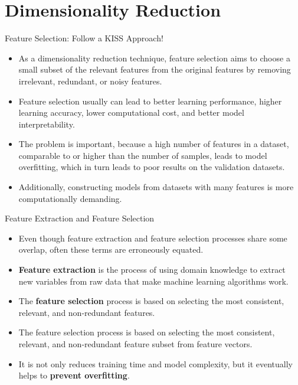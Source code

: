 \documentclass[11pt]{beamer}
\begin{document}
\section{Dimensionality Reduction}

\begin{frame}{Feature Selection: Follow a KISS Approach!}
	\begin{itemize}
		\item As a dimensionality reduction technique, feature selection aims to choose a small subset of the relevant features from the original features by removing irrelevant, redundant, or noisy features. 
		\item Feature selection usually can lead to better learning performance, higher learning accuracy, lower computational cost, and better model interpretability.
		\item The problem is important, because a high number of features in a dataset, comparable to or higher than the number of samples, leads to model overfitting, which in turn leads to poor results on the validation datasets. 
		\item Additionally, constructing models from datasets with many features is more computationally demanding.
	\end{itemize}
\end{frame}
\begin{frame}{Feature Extraction and Feature Selection}
	\begin{itemize}
		\item Even though feature extraction and feature selection processes share some overlap, often these terms are erroneously equated. 
		\item \textbf{Feature extraction} is the process of using domain knowledge to extract new variables from raw data that make machine learning algorithms work. 
		\item The \textbf{feature selection} process is based on selecting the most consistent, relevant, and non-redundant features.
		\item The feature selection process is based on selecting the most consistent, relevant, and non-redundant feature subset from feature vectors. 
		\item It is not only reduces training time and model complexity, but it eventually helps to \textbf{prevent overfitting}.
	\end{itemize}
\end{frame}
\end{document}
